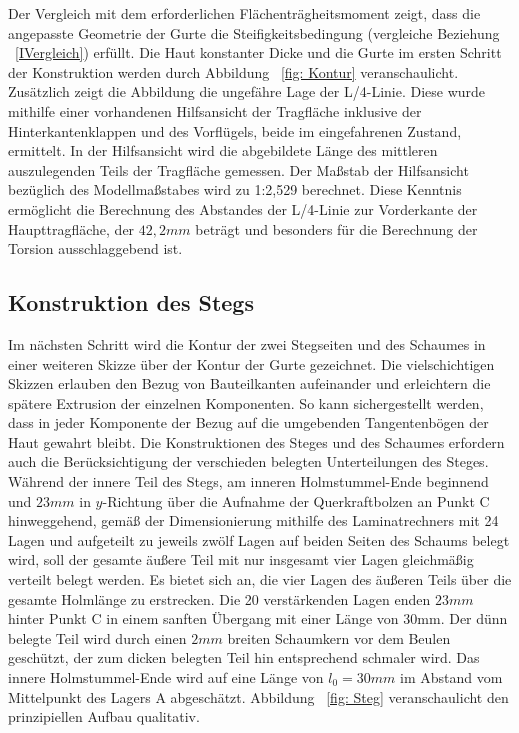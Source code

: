 Der Vergleich mit dem erforderlichen Flächenträgheitsmoment zeigt, dass die angepasste Geometrie der Gurte die Steifigkeitsbedingung (vergleiche Beziehung ~\ref{IVergleich}) erfüllt. Die Haut konstanter Dicke und die Gurte im ersten Schritt der Konstruktion werden durch Abbildung ~\ref{fig: Kontur} veranschaulicht. Zusätzlich zeigt die Abbildung die ungefähre Lage der L/4-Linie. Diese wurde mithilfe einer vorhandenen Hilfsansicht der Tragfläche inklusive der Hinterkantenklappen und des Vorflügels, beide im eingefahrenen Zustand, ermittelt. In der Hilfsansicht wird die abgebildete Länge des mittleren auszulegenden Teils der Tragfläche gemessen. Der Maßstab der Hilfsansicht bezüglich des Modellmaßstabes wird zu 1:2,529 berechnet. Diese Kenntnis ermöglicht die Berechnung des Abstandes der L/4-Linie zur Vorderkante der Haupttragfläche, der $ 42,2mm $ beträgt und besonders für die Berechnung der Torsion ausschlaggebend ist.\\

\subsection{Konstruktion des Stegs}

\noindent Im nächsten Schritt wird die Kontur der zwei Stegseiten und des Schaumes in einer weiteren Skizze über der Kontur der Gurte gezeichnet. Die vielschichtigen Skizzen erlauben den Bezug von Bauteilkanten aufeinander und erleichtern die spätere Extrusion der einzelnen Komponenten. So kann sichergestellt werden, dass in jeder Komponente der Bezug auf die umgebenden Tangentenbögen der Haut gewahrt bleibt. Die Konstruktionen des Steges und des Schaumes erfordern auch die Berücksichtigung der verschieden belegten Unterteilungen des Steges. Während der innere Teil des Stegs, am inneren Holmstummel-Ende beginnend und $ 23mm $ in $y$-Richtung über die Aufnahme der Querkraftbolzen an Punkt C hinweggehend, gemäß der Dimensionierung mithilfe des Laminatrechners mit 24 Lagen und aufgeteilt zu jeweils zwölf Lagen auf beiden Seiten des Schaums belegt wird, soll der gesamte äußere Teil mit nur insgesamt vier Lagen gleichmäßig verteilt belegt werden. Es bietet sich an, die vier Lagen des äußeren Teils über die gesamte Holmlänge zu erstrecken. Die 20 verstärkenden Lagen enden $ 23mm $ hinter Punkt C in einem sanften Übergang mit einer Länge von 30mm. Der dünn belegte Teil wird durch einen $ 2mm $ breiten Schaumkern vor dem Beulen geschützt, der zum dicken belegten Teil hin entsprechend schmaler wird. Das innere Holmstummel-Ende wird auf eine Länge von $ l_{0}=30mm $ im Abstand vom Mittelpunkt des Lagers A abgeschätzt. Abbildung ~\ref{fig: Steg} veranschaulicht den prinzipiellen Aufbau qualitativ.\\

